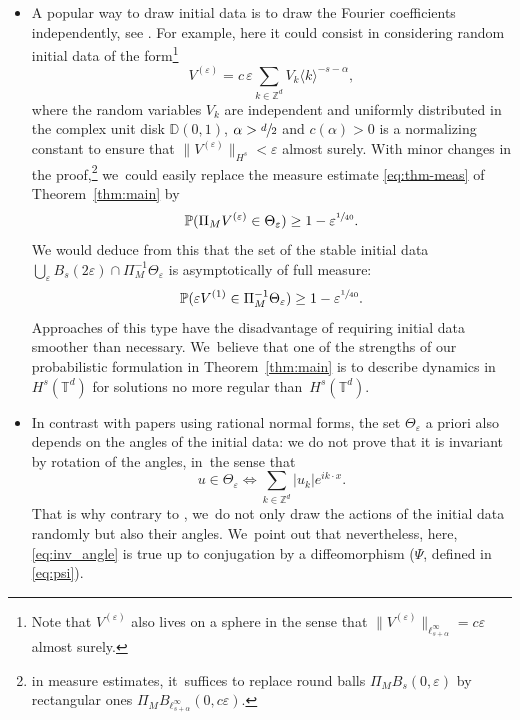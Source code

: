 \documentclass[JEP,XML,SOM,Unicode,published]{cedram}
\theoremstyle{plain}
\theoremstyle{definition}
\newcommand{\T}{\mathbb{T}}
\newcommand{\1}{\mathbf{1}}
\begin{document}
\begin{itemize}
\item A popular way to draw initial data is to draw the Fourier coefficients independently, see \eg \cite{Bou00,KillBill,KtA,LX23}. For example, here it could consist in considering random initial data of the form\footnote{Note that $V^{(\varepsilon)} $ also lives on a sphere in the sense that $\|V^{(\varepsilon)} \|_{\ell^\infty_{s+\alpha}} = c\varepsilon$ almost surely.}\vspace*{-3pt}
\[
V^{(\varepsilon)} = c \, \varepsilon \sum_{k\in \mathbb{Z}^d} V_k \langle k \rangle^{-s-\alpha},
\]
where the random variables $V_k$ are independent and uniformly distributed in the complex unit disk $\mathbb{D}(0,1)$, $\alpha>\sfrac{d}{2}$ and $c(\alpha)>0$ is a normalizing constant to ensure that $\| V^{(\varepsilon)} \|_{H^s}< \varepsilon$ almost surely. With minor changes in the proof,\footnote{in measure estimates, it~suffices to replace round balls $\Pi_M B_s(0,\varepsilon)$ by rectangular ones $\Pi_M B_{\ell^\infty_{s+\alpha}}(0,c\varepsilon)$.} we~could easily replace the measure estimate \eqref{eq:thm-meas} of Theorem~\ref{thm:main} by
\begin{equation}
\label{eq:loi_unif}
\mathbb{P}(\Pi_M V^{(\varepsilon)} \in \Theta_{\varepsilon}) \geq 1 -\varepsilon^{\sfrac{1}{40}}.
\end{equation}
We would deduce from this that the set of the stable initial data $\bigcup_{\varepsilon} B_{s}(2\varepsilon)\cap\Pi_{M}^{-1}\Theta_{\varepsilon}$ is asymptotically of full measure:
\[
\mathbb{P}(\varepsilon V^{(1)} \in \Pi_{M}^{-1}\Theta_{\varepsilon}) \geq 1 -\varepsilon^{\sfrac{1}{40}}.
\]
Approaches of this type have the disadvantage of requiring initial data smoother than necessary. We~believe that one of the strengths of our probabilistic formulation in Theorem~\ref{thm:main} is to describe dynamics in $H^{s}(\T^{d})$ for solutions no more regular than~$H^s(\T^{d})$.

\item In contrast with papers using rational normal forms, the set $\Theta_{\varepsilon}$ a priori also depends on the angles of the initial data: we do not prove that it is invariant by rotation of the angles, in~the sense that
\begin{equation}
\label{eq:inv_angle}
u \in \Theta_\varepsilon \iff \sum_{k\in \mathbb{Z}^d} |u_k| e^{ik\cdot x}.
\end{equation}
That is why contrary to \cite{KillBill,KtA,zhiqiang}, we~do not only draw the actions of the initial data randomly but also their angles. We~point out that nevertheless, here, \eqref{eq:inv_angle} is true up to conjugation by a diffeomorphism ($\Psi$, defined in \eqref{eq:psi}).
\end{itemize}
\end{document}
